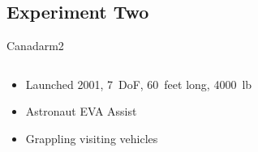 \documentclass[10pt]{beamer}
\begin{document}
\subsection{Experiment Two}

\begin{frame}[fragile]{Canadarm2}
  \begin{columns}[T]
    \begin{column}{.4\textwidth}
      \begin{itemize}
        \setlength\itemsep{1em}
        \item <1->Launched 2001, 7~DoF, 60~feet long, 4000~lb
        \item <2->Astronaut EVA Assist
        \item <3->Grappling visiting vehicles
      \end{itemize}
    \end{column}
    \begin{column}{.6\textwidth}
\end{column}
\end{columns}
\end{frame}
\end{document}
